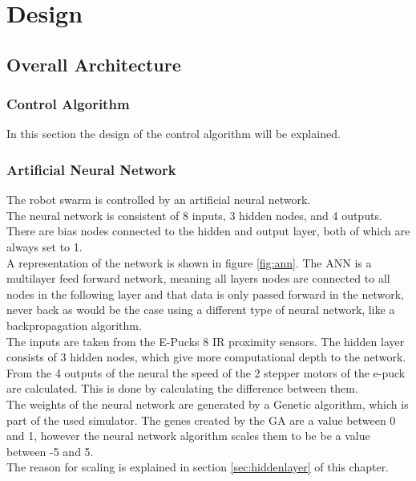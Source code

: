 \chapter{Design}



\section{Overall Architecture}
\subsection{Control Algorithm}
In this section the design of the control algorithm will be explained.

\subsection{Artificial Neural Network}
The robot swarm is controlled by an artificial neural network. \\
The neural network is consistent of 8 inputs, 3 hidden nodes, and 4 outputs. \\
There are bias nodes connected to the hidden and output layer, both of which are always set to 1. \\
A representation of the network is shown in figure \ref{fig:ann}. 
The ANN is a multilayer feed forward network, meaning all layers nodes are connected to all nodes in the following layer and that data is only passed forward in the network, never back as would be the case using a different type of neural network, like a backpropagation algorithm. \\

The inputs are taken from the E-Pucks 8 IR proximity sensors. The hidden layer consists of 3 hidden nodes, which give more computational depth to the network. \\
From the 4 outputs of the neural the speed of the 2 stepper motors of the e-puck are calculated. This is done by calculating the difference between them. \\
The weights of the neural network are generated by a Genetic algorithm, which is part of the used simulator. The genes created by the GA are a value between 0 and 1, however the neural network algorithm scales them to be be a value between -5 and 5.\\ 
The reason for scaling is explained in section \ref{sec:hiddenlayer} of this chapter.\\

